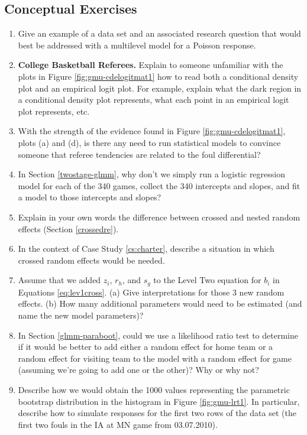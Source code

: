 \documentclass[
]{krantz}
\begin{document}
\hypertarget{conceptual-exercises-8}{%
\subsection{Conceptual Exercises}\label{conceptual-exercises-8}}

\begin{enumerate}
\def\labelenumi{\arabic{enumi}.}
\item
  Give an example of a data set and an associated research question that would best be addressed with a multilevel model for a Poisson response.
\item
  \textbf{College Basketball Referees.} Explain to someone unfamiliar with the plots in Figure \ref{fig:gmu-cdelogitmat1} how to read both a conditional density plot and an empirical logit plot. For example, explain what the dark region in a conditional density plot represents, what each point in an empirical logit plot represents, etc.
\item
  With the strength of the evidence found in Figure \ref{fig:gmu-cdelogitmat1}, plots (a) and (d), is there any need to run statistical models to convince someone that referee tendencies are related to the foul differential?
\item
  In Section \ref{twostage-glmm}, why don't we simply run a logistic regression model for each of the 340 games, collect the 340 intercepts and slopes, and fit a model to those intercepts and slopes?
\item
  Explain in your own words the difference between crossed and nested random effects (Section \ref{crossedre}).
\item
  In the context of Case Study \ref{cs:charter}, describe a situation in which crossed random effects would be needed.
\item
  Assume that we added \(z_{i}\), \(r_{h}\), and \(s_{g}\) to the Level Two equation for \(b_{i}\) in Equations \eqref{eq:lev1cross}. (a) Give interpretations for those 3 new random effects. (b) How many additional parameters would need to be estimated (and name the new model parameters)?
\item
  In Section \ref{glmm-paraboot}, could we use a likelihood ratio test to determine if it would be better to add either a random effect for home team or a random effect for visiting team to the model with a random effect for game (assuming we're going to add one or the other)? Why or why not?
\item
  Describe how we would obtain the 1000 values representing the parametric bootstrap distribution in the histogram in Figure \ref{fig:gmu-lrt1}. In particular, describe how to simulate responses for the first two rows of the data set (the first two fouls in the IA at MN game from 03.07.2010).

\end{enumerate}
\end{document}
